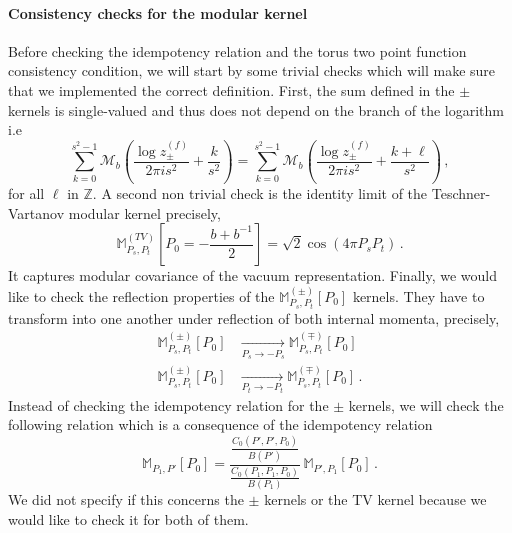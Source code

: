 \documentclass[11pt]{article}
\begin{document}
\paragraph{Consistency checks for the modular kernel} Before checking the idempotency relation and the torus two point function consistency condition, we will start by some trivial checks which will make sure that we implemented the correct definition. First, the sum defined in the $\pm$ kernels is single-valued and thus does not depend on the branch of the logarithm i.e
\begin{equation}
    \sum_{k=0}^{s^2-1} \mathcal{M}_b\left(\frac{\log z_{\pm}^{(f)}}{2\pi i s^2}+\frac{k}{s^2}\right)=\sum_{k=0}^{s^2-1} \mathcal{M}_b\left(\frac{\log z_{\pm}^{(f)}}{2\pi i s^2}+\frac{k+\ell}{s^2}\right)\,,
\end{equation}
for all $\ell$ in $\mathbb{Z}$. A second non trivial check is the identity limit of the Teschner-Vartanov modular kernel precisely,
\begin{equation}\label{eq:identitylimit}
    \mathbb{M}^{(TV)}_{P_s,P_t}\left[P_0=-\frac{b+b^{-1}}{2}\right]=\sqrt{2}\cos(4\pi P_s P_t)\,.
\end{equation}
It captures modular covariance of the vacuum representation. Finally, we would like to check the reflection properties of the $\mathbb{M}^{(\pm)}_{P_s,P_t}\left[P_0\right]$ kernels. They have to transform into one another under reflection of both internal momenta, precisely,
\begin{equation}\label{eq:reflectionproperty}
    \begin{aligned}
        \mathbb{M}^{(\pm)}_{P_s,P_t}\left[P_0\right] &\underset{P_s\to -P_s}{\rightarrow} \mathbb{M}^{(\mp)}_{P_s,P_t}\left[P_0\right]\\
        \mathbb{M}^{(\pm)}_{P_s,P_t}\left[P_0\right] &\underset{P_t\to -P_t}{\rightarrow} \mathbb{M}^{(\mp)}_{P_s,P_t}\left[P_0\right]\,.
    \end{aligned}
\end{equation}
Instead of checking the idempotency relation for the $\pm$ kernels, we will check the following relation which is a consequence of the idempotency relation
\begin{equation}
    \mathbb{M}_{P_1,P'}[P_0] = \frac{\frac{C_0(P', P', P_0)}{B(P')}}{\frac{C_0(P_1, P_1, P_0)}{B(P_1)}}\,\mathbb{M}_{P', P_1}[P_0]\,.
\end{equation}
We did not specify if this concerns the $\pm$ kernels or the TV kernel because we would like to check it for both of them.
\end{document}
